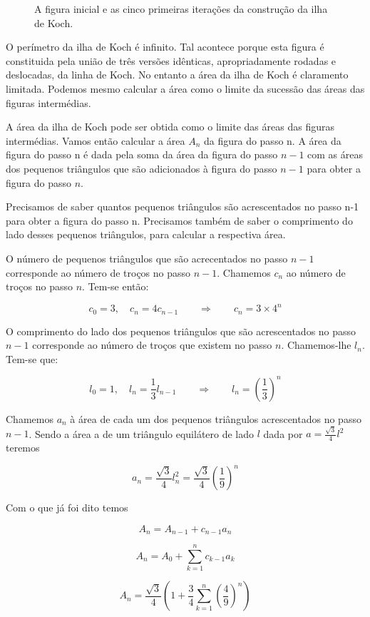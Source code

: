 \documentclass[11pt]{article}
\begin{document}
\begin{figure}[H]
  \caption{A figura inicial e as cinco primeiras iterações da
    construção da ilha de Koch.}
\end{figure}


O perímetro da ilha de Koch é infinito. Tal acontece porque esta
figura é constituida pela união de três versões idênticas,
apropriadamente rodadas e deslocadas, da linha de Koch. No entanto a
área da ilha de Koch é claramento limitada. Podemos mesmo calcular a
área como o limite da sucessão das áreas das figuras intermédias.

A área da ilha de Koch pode ser obtida como o limite das áreas das
figuras intermédias. Vamos então calcular a área $A_n$ da figura
do passo n. A área da figura do passo n é dada pela soma da área da
figura do passo $n-1$ com as áreas dos pequenos triângulos que são
adicionados à figura do passo $n-1$ para obter a figura do passo $n$.

Precisamos de saber quantos pequenos triângulos são acrescentados no
passo n-1 para obter a figura do passo n. Precisamos também de saber o
comprimento do lado desses pequenos triângulos, para calcular a
respectiva área.

O número de pequenos triângulos que são acrecentados no passo $n-1$
corresponde ao número de troços no passo $n-1$. Chamemos $c_n$ ao
número de troços no passo $n$. Tem-se então:

\[c_0=3, \quad c_n=4c_{n-1} \qquad \Rightarrow \qquad c_n = 3\times 4^n \]

O comprimento do lado dos pequenos triângulos que são acrescentados no
passo $n-1$ corresponde ao número de troços que existem no passo
$n$. Chamemos-lhe $l_n$. Tem-se que:

\[
 l_0=1, 
\quad l_n=\frac{1}{3}l_{n-1}
\qquad \Rightarrow
\qquad l_n = \left(\frac{1}{3}\right)^n
\]

Chamemos $a_n$ à área de cada um dos pequenos triângulos acrescentados
no passo $n-1$. Sendo a área a de um triângulo equilátero de lado $l$ dada
por $a=\frac{\sqrt{3}}{4}l^2$ teremos

\[
a_n = \frac{\sqrt{3}}{4} l_n^2 = \frac{\sqrt{3}}{4} \left(\frac{1}{9}\right)^n
\]

Com o que já foi dito temos

\[
A_n = A_{n-1} + c_{n-1}a_n
\]

\[
A_n = A_0 + \sum_{k=1}^n c_{k-1}a_k
\]

\[ A_n = \frac{\sqrt{3}}{4} \left( 1 + \frac{3}{4} \sum_{k=1}^n \left(\frac{4}{9}\right)^n \right)
\]
\end{document}

